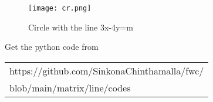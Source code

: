 \documentclass[journal,12pt,twocolumn]{IEEEtran}
\begin{document}
\begin{figure}[h!]
\texttt{[image: cr.png]}
\caption{Circle with the line 3x-4y=m}
\end{figure}

\newpage
Get the python code from
\begin{table}[h]
\large
\centering
\begin{tabular}{|l|}
\hline
https://github.com/SinkonaChinthamalla/fwc/
\\blob/main/matrix/line/codes \\
\hline
\end{tabular}
\end{table}	
\end{document}
